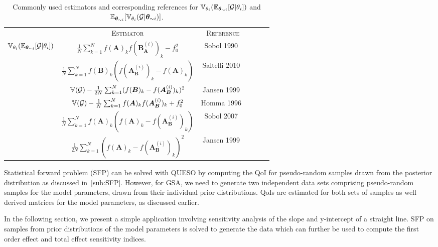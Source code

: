 \begin{table}[htbp]
\centering
\begin{tabular}{@{}*{6}{c}@{}}
\toprule
& \textsc{Estimator} &  \textsc{Reference} \\
\cmidrule(r){2-3}\cmidrule(l){4-6}
\multirow{4}{*}{$\operatorname{\mathbb{V}}_{\theta_{i}}(\operatorname{\mathbb{E}}_{\bm \theta_{\sim i}}[\mathcal{G}\vert\theta_{i}])$} & $\frac{1}{N}\sum_{k=1}^{N} f(\bm A)_{k}f(\bm B_{\bm A}^{(i)})_{k} - f_{0}^{2}$ &  Sobol 1990~\cite{Sobol:1990}  \\
\cmidrule(lr){2-2}\cmidrule(lr){3-3}
& $\frac{1}{N}\sum_{k=1}^{N} f(\bm B)_{k}(f(\bm A_{\bm B}^{(i)})_{k} - f(\bm A)_{k})$ &  Saltelli 2010~\cite{Saltelli:2010} \\
\cmidrule(lr){2-2}\cmidrule(lr){3-3}
& $\operatorname{\mathbb{V}}(\mathcal{G}) - \frac{1}{2N}\sum_{k=1}^{N} (f(\bm B)_{k} - f(\bm A_{\bm B}^{(i)})_{k})^{2}$ & Jansen 1999~\cite{Jansen:1999}   \\
\cmidrule{1-3}
\multirow{3}{*}{$\E_{\bm \theta_{\sim i}}[\V_{\theta_{i}}(\mathcal{G}\vert\bm{\theta}_{\sim i})]$} & $\operatorname{\mathbb{V}}(\mathcal{G}) - \frac{1}{N}\sum_{k=1}^{N} f(\bm A)_{k}f(\bm A_{\bm B}^{(i)})_{k} + f_{0}^{2}$ &  Homma 1996~\cite{Homma:1996}  \\
\cmidrule(lr){2-2}\cmidrule(lr){3-3}
& $\frac{1}{N}\sum_{k=1}^{N} f(\bm A)_{k}(f(\bm A)_{k} - f(\bm A_{\bm B}^{(i)})_{k})$ &  Sobol 2007~\cite{Sobol:2007} \\
\cmidrule(lr){2-2}\cmidrule(lr){3-3}
& $\frac{1}{2N}\sum_{k=1}^{N} (f(\bm A)_{k} - f(\bm A_{\bm B}^{(i)})_{k})^{2}$ & Jansen 1999~\cite{Jansen:1999}   \\
\bottomrule
\end{tabular}
\caption{Commonly used estimators and corresponding references for $\operatorname{\mathbb{V}}_{\theta_{i}}(\operatorname{\mathbb{E}}_{\bm \theta_{\sim i}}[\mathcal{G}\vert\theta_{i}])$ and $\E_{\bm \theta_{\sim i}}[\V_{\theta_{i}}(\mathcal{G}\vert\bm{\theta}_{\sim i})]$.}
\label{tab:estimators}
\end{table}

Statistical forward problem (SFP) can be solved with QUESO by computing the QoI for pseudo-random samples drawn
from the posterior distribution as discussed in~\ref{sub:SFP}. However, for GSA, we need to generate two independent
data sets comprising pseudo-random samples for the model parameters, drawn from their individual prior distributions.
QoIs are estimated for both sets of samples as well derived matrices for the model parameters, as discussed earlier.

In the following section, we present a simple application involving sensitivity analysis of the slope and y-intercept
of a straight line. SFP on samples from prior distributions of the model parameters is solved to generate the data
which can further be used to compute the first order effect and total effect sensitivity indices.


